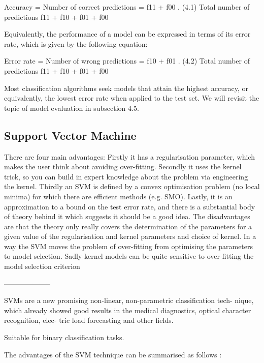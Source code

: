 Accuracy = Number of correct predictions = f11 + f00 . (4.1) Total number of predictions f11 + f10 + f01 + f00

Equivalently, the performance of a model can be expressed in terms of its error rate, which is given by the following equation:

Error rate = Number of wrong predictions = f10 + f01 . (4.2) Total number of predictions f11 + f10 + f01 + f00

Most classification algorithms seek models that attain the highest accuracy, or equivalently, the lowest error rate when applied to the test set. We will revisit the topic of model evaluation in subsection 4.5.

\subsection{Support Vector Machine}

There are four main advantages: Firstly it has a regularisation parameter, which makes the user think about avoiding over-fitting. Secondly it uses the kernel trick, so you can build in expert knowledge about the problem via engineering the kernel. Thirdly an SVM is defined by a convex optimisation problem (no local minima) for which there are efficient methods (e.g. SMO). Lastly, it is an approximation to a bound on the test error rate, and there is a substantial body of theory behind it which suggests it should be a good idea.
The disadvantages are that the theory only really covers the determination of the parameters for a given value of the regularisation and kernel parameters and choice of kernel. In a way the SVM moves the problem of over-fitting from optimising the parameters to model selection. Sadly kernel models can be quite sensitive to over-fitting the model selection criterion \cite{cawley2010over}

--------------------

SVMs are a new promising non-linear, non-parametric classification tech- nique, which already showed good results in the medical diagnostics, optical character recognition, elec- tric load forecasting and other fields.

Suitable for binary classification tasks.

The advantages of the SVM technique can be summarised as follows \cite{auria2008support}:


